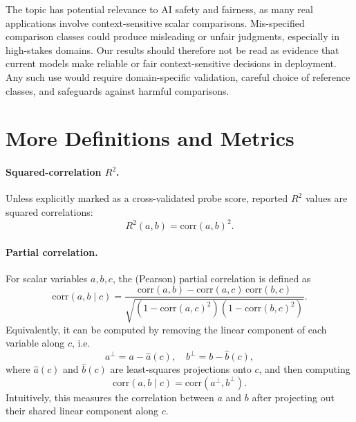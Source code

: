 \documentclass{article}
\begin{document}
The topic has potential relevance to AI safety and fairness, as many real applications involve context-sensitive scalar comparisons.
Mis-specified comparison classes could produce misleading or unfair judgments, especially in high-stakes domains.
Our results should therefore not be read as evidence that current models make reliable or fair context-sensitive decisions in deployment.
Any such use would require domain-specific validation, careful choice of reference classes, and safeguards against harmful comparisons.




\appendix
{}
\onecolumn

\section{More Definitions and Metrics}
\label{app:definitions}
\paragraph{Squared-correlation $R^2$.}
Unless explicitly marked as a cross-validated probe score, reported $R^2$ values are squared correlations:
\[
R^2(a,b)=\mathrm{corr}(a,b)^2.
\]

\paragraph{Partial correlation.}\label{app:partial-corr}
For scalar variables $a,b,c$, the (Pearson) partial correlation is defined as
\[
\mathrm{corr}(a,b \mid c)
=
\frac{
\mathrm{corr}(a,b) - \mathrm{corr}(a,c)\,\mathrm{corr}(b,c)
}{
\sqrt{(1-\mathrm{corr}(a,c)^2)(1-\mathrm{corr}(b,c)^2)}
}.
\]
Equivalently, it can be computed by removing the linear component of each variable along $c$, i.e.
\[
a^\perp = a - \hat a(c), \quad b^\perp = b - \hat b(c),
\]
where $\hat a(c)$ and $\hat b(c)$ are least-squares projections onto $c$, and then computing
\[
\mathrm{corr}(a,b \mid c) = \mathrm{corr}(a^\perp, b^\perp).
\]
Intuitively, this measures the correlation between $a$ and $b$ after projecting out their shared linear component along $c$.

\end{document}

